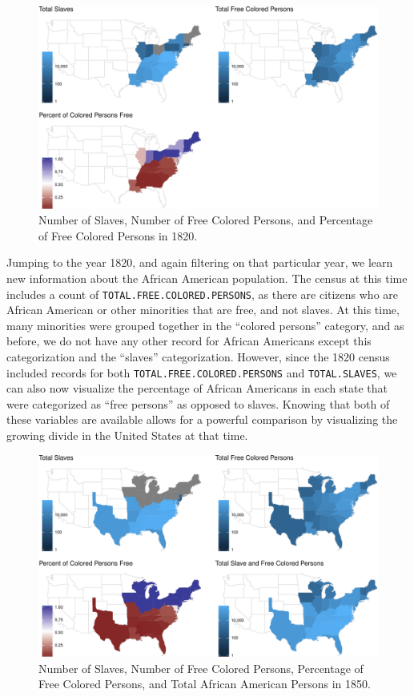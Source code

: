 \documentclass[11pt,]{article}
\begin{document}
\begin{figure}[htbp]
\centering
\includegraphics{writeup_files/figure-latex/unnamed-chunk-5-1.pdf}
\caption{Number of Slaves, Number of Free Colored Persons, and
Percentage of Free Colored Persons in 1820.}
\end{figure}

Jumping to the year 1820, and again filtering on that particular year,
we learn new information about the African American population. The
census at this time includes a count of
\texttt{TOTAL.FREE.COLORED.PERSONS}, as there are citizens who are
African American or other minorities that are free, and not slaves. At
this time, many minorities were grouped together in the ``colored
persons'' category, and as before, we do not have any other record for
African Americans except this categorization and the ``slaves''
categorization. However, since the 1820 census included records for both
\texttt{TOTAL.FREE.COLORED.PERSONS} and \texttt{TOTAL.SLAVES}, we can
also now visualize the percentage of African Americans in each state
that were categorized as ``free persons'' as opposed to slaves. Knowing
that both of these variables are available allows for a powerful
comparison by visualizing the growing divide in the United States at
that time.

\begin{figure}[htbp]
\centering
\includegraphics{writeup_files/figure-latex/unnamed-chunk-6-1.pdf}
\caption{Number of Slaves, Number of Free Colored Persons, Percentage of
Free Colored Persons, and Total African American Persons in 1850.}
\end{figure}
\end{document}
